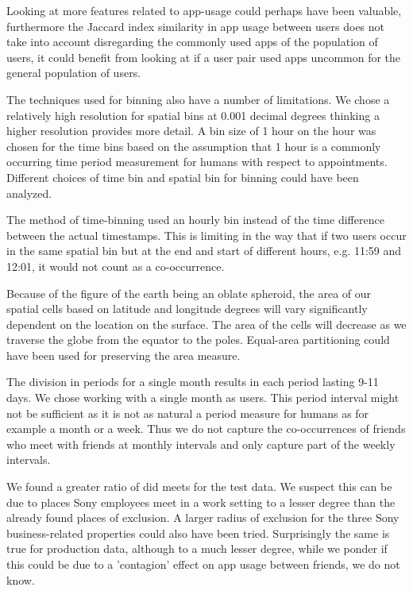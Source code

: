 Looking at more features related to app-usage could perhaps have been valuable, furthermore the Jaccard index similarity in app usage between users does not take into account disregarding the commonly used apps of the population of users, it could benefit from looking at if a user pair used apps uncommon for the general population of users.

The techniques used for binning also have a number of limitations.
We chose a relatively high resolution for spatial bins at 0.001 decimal degrees thinking a higher resolution provides more detail. A bin size of 1 hour on the hour was chosen for the time bins based on the assumption that 1 hour is a commonly occurring time period measurement for humans with respect to appointments. Different choices of time bin and spatial bin for binning could have been analyzed.

The method of time-binning used an hourly bin instead of the time difference between the actual timestamps. This is limiting in the way that if two users occur in the same spatial bin but at the end and start of different hours, e.g. 11:59 and 12:01, it would not count as a co-occurrence.

Because of the figure of the earth being an oblate spheroid, the area of our spatial cells based on latitude and longitude degrees will vary significantly dependent on the location on the surface. The area of the cells will decrease as we traverse the globe from the equator to the poles. Equal-area partitioning could have been used for preserving the area measure.

The division in periods for a single month results in each period lasting 9-11 days. We chose working with a single month as users. This period interval might not be sufficient as it is not as natural a period measure for humans as for example a month or a week. Thus we do not capture the co-occurrences of friends who meet with friends at monthly intervals and only capture part of the weekly intervals.

We found a greater ratio of did meets for the test data. We suspect this can be due to places Sony employees meet in a work setting to a lesser degree than the already found places of exclusion. A larger radius of exclusion for the three Sony business-related properties could also have been tried.
Surprisingly the same is true for production data, although to a much lesser degree, while we ponder if this could be due to a 'contagion' effect on app usage between friends, we do not know.


